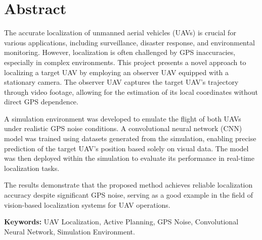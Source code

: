 \chapter*{Abstract}

The accurate localization of unmanned aerial vehicles (UAVs) is crucial for various applications, including surveillance, disaster response, and environmental monitoring. However, localization is often challenged by GPS inaccuracies, especially in complex environments. This project presents a novel approach to localizing a target UAV by employing an observer UAV equipped with a stationary camera. The observer UAV captures the target UAV's trajectory through video footage, allowing for the estimation of its local coordinates without direct GPS dependence.

A simulation environment was developed to emulate the flight of both UAVs under realistic GPS noise conditions. A convolutional neural network (CNN) model was trained using datasets generated from the simulation, enabling precise prediction of the target UAV’s position based solely on visual data. The model was then deployed within the simulation to evaluate its performance in real-time localization tasks.

The results demonstrate that the proposed method achieves reliable localization accuracy despite significant GPS noise, serving as a good example in the field of vision-based localization systems for UAV operations. 

\vfill
\textbf{Keywords:} UAV Localization, Active Planning, GPS Noise, Convolutional Neural Network, Simulation Environment.
\clearpage